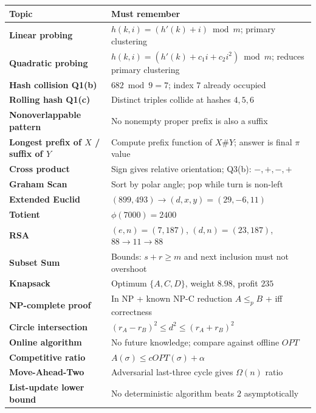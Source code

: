 \documentclass[10.5pt,a4paper]{article}
\begin{document}
\begin{center}
\small
\begin{tabularx}{0.98\textwidth}{>{\bfseries}p{3.2cm}X}
\toprule
Topic & Must remember\\
\midrule
Linear probing & $h(k,i)=(h'(k)+i)\bmod m$; primary clustering\\
Quadratic probing & $h(k,i)=(h'(k)+c_1i+c_2i^2)\bmod m$; reduces primary clustering\\
Hash collision Q1(b) & $682\bmod9=7$; index $7$ already occupied\\
Rolling hash Q1(c) & Distinct triples collide at hashes $4,5,6$\\
Nonoverlappable pattern & No nonempty proper prefix is also a suffix\\
Longest prefix of $X$ / suffix of $Y$ & Compute prefix function of $X\#Y$; answer is final $\pi$ value\\
Cross product & Sign gives relative orientation; Q3(b): $-,+,-,+$\\
Graham Scan & Sort by polar angle; pop while turn is non-left\\
Extended Euclid & $(899,493)\to(d,x,y)=(29,-6,11)$\\
Totient & $\phi(7000)=2400$\\
RSA & $(e,n)=(7,187)$, $(d,n)=(23,187)$, $88\to11\to88$\\
Subset Sum & Bounds: $s+r\ge m$ and next inclusion must not overshoot\\
Knapsack & Optimum $\{A,C,D\}$, weight $8.98$, profit $235$\\
NP-complete proof & In NP + known NP-C reduction $A\le_p B$ + iff correctness\\
Circle intersection & $(r_A-r_B)^2\le d^2\le(r_A+r_B)^2$\\
Online algorithm & No future knowledge; compare against offline $OPT$\\
Competitive ratio & $A(\sigma)\le cOPT(\sigma)+\alpha$\\
Move-Ahead-Two & Adversarial last-three cycle gives $\Omega(n)$ ratio\\
List-update lower bound & No deterministic algorithm beats $2$ asymptotically\\
\bottomrule
\end{tabularx}
\end{center}
\end{document}
